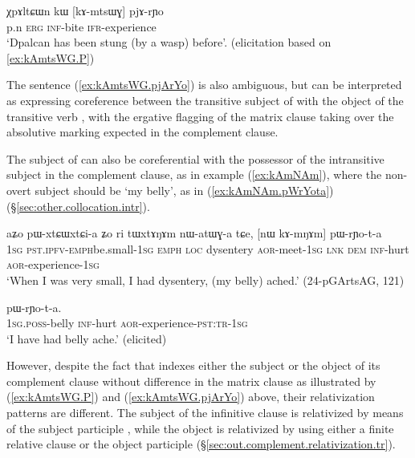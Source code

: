 \begin{exe}
\ex   \label{ex:kAmtsWG.pjArYo} 
\gll χpɤltɕɯn kɯ [kɤ-mtsɯɣ]  pjɤ-rɲo  \\
 p.n \textsc{erg} \textsc{inf}-bite \textsc{ifr}-experience \\
\glt `Dpalcan has been stung (by a wasp) before'. (elicitation based on \ref{ex:kAmtsWG.P})
\end{exe} 

The sentence (\ref{ex:kAmtsWG.pjArYo}) is also ambiguous, but can be interpreted as expressing coreference between the transitive subject of  with the object of the transitive verb , with the ergative flagging of the matrix clause taking over the absolutive marking expected in the complement clause.


The subject of  can also be coreferential with the possessor of the intransitive subject in the complement clause, as in example (\ref{ex:kAmNAm}), where the non-overt subject should be  `my belly', as in (\ref{ex:kAmNAm.pWrYota}) (§\ref{sec:other.collocation.intr}).
 
 \begin{exe}
\ex \label{ex:kAmNAm}
\gll aʑo pɯ-xtɕɯ\redp{}xtɕi-a ʑo ri tɯxtɤŋɤm nɯ-atɯɣ-a tɕe, [nɯ kɤ-mŋɤm] pɯ-rɲo-t-a \\
\textsc{1sg} \textsc{pst}.\textsc{ipfv}-\textsc{emph}\redp{}be.small-\textsc{1sg} \textsc{emph} \textsc{loc} dysentery \textsc{aor}-meet-\textsc{1sg} \textsc{lnk} \textsc{dem} \textsc{inf}-hurt \textsc{aor}-experience-\textsc{1sg} \\
\glt `When I was very small, I had dysentery, (my belly) ached.'  (24-pGArtsAG, 121)
\end{exe}

\begin{exe} 
\ex \label{ex:kAmNAm.pWrYota}
 pɯ-rɲo-t-a. \\
\textsc{1sg}.\textsc{poss}-belly \textsc{inf}-hurt \textsc{aor}-experience-\textsc{pst}:\textsc{tr}-\textsc{1sg} \\
\glt `I have had belly ache.' (elicited)
\end{exe} 

However, despite the fact that  indexes either the subject or the object of its complement clause without difference in the matrix clause as illustrated by (\ref{ex:kAmtsWG.P}) and (\ref{ex:kAmtsWG.pjArYo}) above, their relativization patterns are different. The subject of the infinitive clause is relativized by means of the subject participle , while the object is relativized by using either a finite relative clause or the object participle  (§\ref{sec:out.complement.relativization.tr}). 

